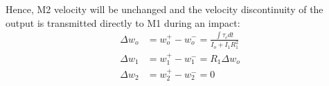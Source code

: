 %
Hence, M2 velocity will be unchanged and the velocity discontinuity of the output is transmitted directly to M1 during an impact:
%
\begin{align}
\Delta w_o  &= w_o^+ - w_o^- = \frac{ \int{\tau_c dt} }{ I_o + I_1 R_1^2}  \\
\Delta w_1  &= w_1^+ - w_1^- = R_1 \Delta w_o \\
\Delta w_2  &= w_2^+ - w_2^- =  0
\label{eq:dsdm_impact_gen_delta_w1}
\end{align}


%




